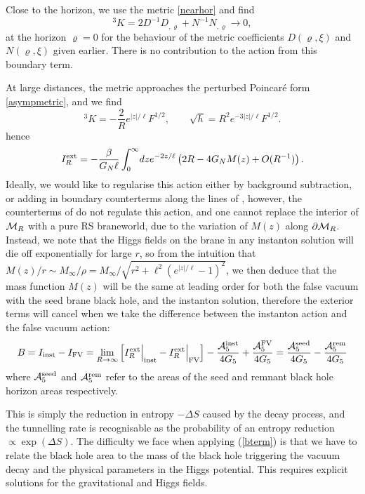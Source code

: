\documentclass[aps,12pt,prd,superscriptaddress,preprintnumbers, 
	amssymb,
	amsmath,
	notitlepage,
	longbibliography,
	nofootinbib]{revtex4-1}
\newcommand{\be}{\begin{equation}}
\newcommand{\ee}{\end{equation}}
\begin{document}
Close to the horizon, we use the metric \eqref{nearhor} and find
\begin{equation}
{}^3\!K=2D^{-1}D_{,\varrho}+N^{-1}N_{,\varrho}\to 0,
\end{equation}
at the horizon $\varrho=0$ for the behaviour of the metric coefficients 
$D(\varrho,\xi)$ and $N(\varrho,\xi)$ given earlier. There is no contribution
to the action from this boundary term.

At large distances, the metric approaches the perturbed Poincar\'e 
form \eqref{asympmetric}, and we find
\be
{}^3\!K=-\frac{2}{R}e^{|z|/\ell} F^{1/2},\qquad
\sqrt{h}=R^2e^{-3|z|/\ell} F^{1/2}.
\ee
hence
\be
I_R^{\rm ext}=-\frac{\beta}{G_N\ell}\int_0^\infty \! dz
e^{-2z/\ell}\left(2R-4G_NM(z)+O(R^{-1})\right).
\ee
Ideally, we would like to regularise this action either by background
subtraction, or adding in boundary counterterms along the lines of
\cite{Balasubramanian:1999re,Emparan:1999pm}, however, the 
counterterms of \cite{Emparan:1999pm} do not regulate this action, 
and one cannot replace the interior of ${\cal M}_R$ with a pure RS
braneworld, due to the variation of $M(z)$ along $\partial {\cal M}_R$.
Instead, we note that the Higgs fields on the brane in any instanton
solution will die off exponentially for large $r$, so from the intuition 
that $M(z)/r \sim M_\infty/\rho = M_\infty/\sqrt{r^2 + \ell^2 (e^{|z|/\ell}-1)^2}$, 
we then deduce that the mass function $M(z)$ will be the same at leading 
order for both the false vacuum with the seed brane black hole, and the 
instanton solution, therefore the exterior terms will cancel when we take the
difference between the instanton action and the false vacuum action:
\be
B = I_{\text{inst}} - I_{\text{FV}} = \lim_{R\to\infty} \left [
I_R^{\rm ext} \Big|_{\text{inst}} -I_R^{\rm ext} \Big|_{\text{FV}} \right]
-\frac{{\cal A}_5^{\text{inst}}}{4G_5}
+\frac{{\cal A}_5^{\text{FV}}}{4G_5}
= \frac{{\cal A}_5^{\rm seed}}{4G_5}
-\frac{{\cal A}_5^{\rm rem}}{4G_5}
\label{bterm}
\ee
where ${\cal A}_5^{\rm seed}$ and ${\cal A}_5^{\rm rem}$ refer to the areas of the seed 
and remnant black hole horizon areas respectively.

This is simply the reduction in entropy $-\Delta S$ caused by the decay 
process, and the tunnelling rate is recognisable as the probability of an 
entropy reduction $\propto \exp(\Delta S)$.
The difficulty we face when applying (\ref{bterm}) is that we have to relate the
black hole area to the mass of the black hole triggering the vacuum decay and the
physical parameters in the Higgs potential. This requires explicit solutions for the
gravitational and Higgs fields.
\end{document}
